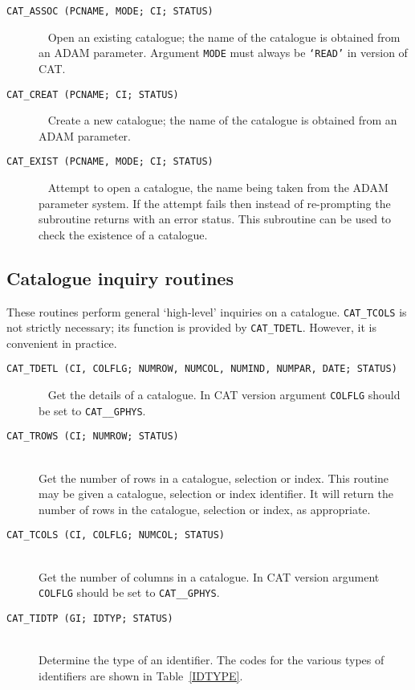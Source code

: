 \begin{description}

  \item[ {\tt CAT\_ASSOC (PCNAME, MODE; CI; STATUS) } ] ~
  \newline Open an existing catalogue; the name of the catalogue is 
   obtained from an ADAM parameter. Argument {\tt MODE} must always
   be {\tt `READ'} in version \CATversion of CAT.

  \item[ {\tt CAT\_CREAT (PCNAME; CI; STATUS) } ] ~
  \newline Create a new catalogue; the name of the catalogue is obtained
   from an ADAM parameter.

  \item[ {\tt CAT\_EXIST (PCNAME, MODE; CI; STATUS) } ] ~
  \newline Attempt to open a catalogue, the name being taken from the
   ADAM parameter system. If the attempt fails then instead of 
   re-prompting the subroutine returns with an error status. This 
   subroutine can be used to check the existence of a catalogue.

\end{description}


\subsection{Catalogue inquiry routines}

These routines perform general `high-level' inquiries on a catalogue. 
{\tt CAT\_TCOLS} is not strictly necessary; its function is 
provided by {\tt CAT\_TDETL}. However, it is convenient in practice.

\begin{description}

  \item[ {\tt CAT\_TDETL (CI, COLFLG; NUMROW, NUMCOL, NUMIND, NUMPAR, 
   DATE; STATUS) } ] ~
  \newline Get the details of a catalogue. In CAT version \CATversion 
   argument {\tt COLFLG} should be set to {\tt CAT\_\_GPHYS}.

  \item[ {\tt CAT\_TROWS (CI; NUMROW; STATUS) } ] ~ \\
   Get the number of rows in a catalogue, selection or index. This
   routine may be given a catalogue, selection or index identifier.  It
   will return the number of rows in the catalogue, selection or index,
   as appropriate.

  \item[ {\tt CAT\_TCOLS (CI, COLFLG; NUMCOL; STATUS) } ] ~ \\
   Get the number of columns in a catalogue. In CAT version \CATversion 
   argument {\tt COLFLG} should be set to {\tt CAT\_\_GPHYS}.

  \item[ {\tt CAT\_TIDTP (GI; IDTYP; STATUS) } ] ~ \\
   Determine the type of an identifier. The codes for the various types
   of identifiers are shown in Table~\ref{IDTYPE}.

\end{description}

